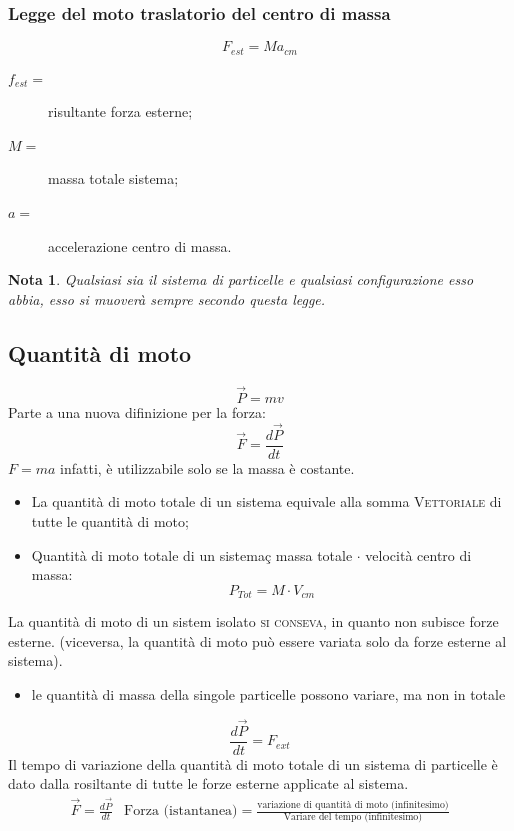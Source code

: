 \documentclass{book}
\newtheorem{nota}{Nota}[section]
\begin{document}
\subsubsection{Legge del moto traslatorio del centro di massa}
\label{sec:leggedelmottrasldelcndimassa}
\begin{equation}
  \label{eq:leggedelmottrasldelcndimassa}
  F_{est}=Ma_{cm}
\end{equation}
\begin{description}
\item[$f_{est}=$] risultante forza esterne;
\item[$M=$] massa totale sistema;
\item[$a=$] accelerazione centro di massa.
\end{description}
\begin{nota}
  Qualsiasi sia il sistema di particelle e qualsiasi configurazione esso abbia, esso si muoverà sempre secondo questa legge.
\end{nota}

\subsection{Quantità di moto}
\label{sec:quantmoto}

\begin{equation}
  \label{eq:quantmoto}
  \vec{P}=mv
\end{equation}
Parte a una nuova difinizione per la forza:
\begin{equation*}
  \vec{F}=\frac{d\vec{P}}{dt}
\end{equation*}
$F=ma$ infatti, è utilizzabile solo se la massa è costante.
\begin{itemize}
\item La quantità di moto totale di un sistema equivale alla somma \textsc{Vettoriale} di tutte le quantità di moto;
\item Quantità di moto totale di un sistemaç massa totale $\cdot$ velocità centro di massa:
  \begin{equation*}
    P_{Tot}=M\cdot V_{cm}
  \end{equation*}
\end{itemize}
La quantità di moto di un sistem isolato \textsc{si conseva}, in quanto non subisce forze esterne. (viceversa, la quantità di moto può essere variata solo da forze esterne al sistema).
\begin{itemize}
\item le quantità di massa della singole particelle possono variare, ma non in totale
\end{itemize}
\begin{equation*}
  \frac{d\vec{P}}{dt}=F_{ext}
\end{equation*}
Il tempo di variazione della quantità di moto totale di un sistema di particelle è dato dalla rosiltante di tutte le forze esterne applicate al sistema.
\begin{eqnarray*}
  \vec{F}=\frac{d\vec{P}}{dt} & \text{Forza (istantanea)} = \frac{\text{variazione di quantità di moto (infinitesimo)}}{\text{Variare del tempo (infinitesimo)}}
\end{eqnarray*}
\end{document}
